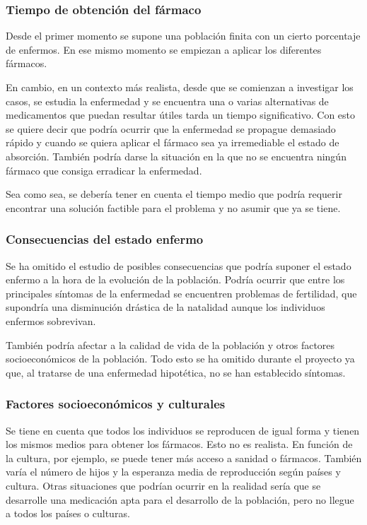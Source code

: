 \documentclass[graybox]{SNmult}
\begin{document}
	\subsubsection{Tiempo de obtención del fármaco}
	Desde el primer momento se supone una población finita con un cierto porcentaje de enfermos. En ese mismo momento se empiezan a aplicar los diferentes fármacos. 
	
	En cambio, en un contexto más realista, desde que se comienzan a investigar los casos, se estudia la enfermedad y se encuentra una o varias alternativas de medicamentos que puedan resultar útiles tarda un tiempo significativo. Con esto se quiere decir que podría ocurrir que la enfermedad se propague demasiado rápido y cuando se quiera aplicar el fármaco sea ya irremediable el estado de absorción. También podría darse la situación en la que no se encuentra ningún fármaco que consiga erradicar la enfermedad. 
	
	Sea como sea, se debería tener en cuenta el tiempo medio que podría requerir encontrar una solución factible para el problema y no asumir que ya se tiene. 
	
	\subsubsection{Consecuencias del estado enfermo}
	Se ha omitido el estudio de posibles consecuencias que podría suponer el estado enfermo a la hora de la evolución de la población. Podría ocurrir que entre los principales síntomas de la enfermedad se encuentren problemas de fertilidad, que supondría una disminución drástica de la natalidad aunque los individuos enfermos sobrevivan. 
	
	También podría afectar a la calidad de vida de la población y otros factores socioeconómicos de la población. Todo esto se ha omitido durante el proyecto ya que, al tratarse de una enfermedad hipotética, no se han establecido síntomas. 
	
	\subsubsection{Factores socioeconómicos y culturales}
	Se tiene en cuenta que todos los individuos se reproducen de igual forma y tienen los mismos medios para obtener los fármacos. Esto no es realista. En función de la cultura, por ejemplo, se puede tener más acceso a sanidad o fármacos. También varía el número de hijos y la esperanza media de reproducción según países y cultura. Otras situaciones que podrían ocurrir en la realidad sería que se desarrolle una medicación apta para el desarrollo de la población, pero no llegue a todos los países o culturas. 
	
\end{document}
